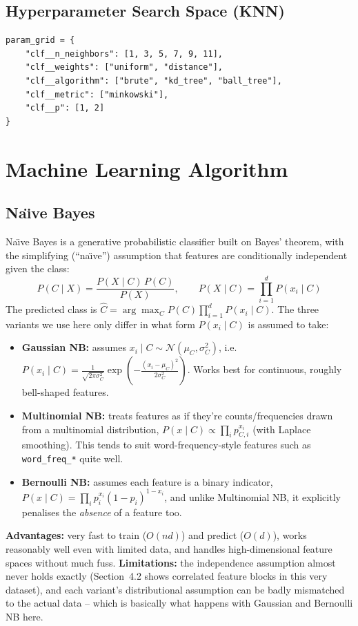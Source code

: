 \documentclass[12pt,a4paper]{article}
\begin{document}
\subsection*{Hyperparameter Search Space (KNN)}
\begin{lstlisting}
param_grid = {
    "clf__n_neighbors": [1, 3, 5, 7, 9, 11],
    "clf__weights": ["uniform", "distance"],
    "clf__algorithm": ["brute", "kd_tree", "ball_tree"],
    "clf__metric": ["minkowski"],
    "clf__p": [1, 2]
}
\end{lstlisting}


\section{Machine Learning Algorithm}
\subsection{Na\"{\i}ve Bayes}
Na\"{\i}ve Bayes is a generative probabilistic classifier built on Bayes' theorem, with the simplifying (``na\"{\i}ve'') assumption that features are conditionally independent given the class:
\[
P(C \mid X) = \frac{P(X \mid C)\,P(C)}{P(X)}, \qquad P(X \mid C) = \prod_{i=1}^{d} P(x_i \mid C)
\]
The predicted class is $\hat{C} = \arg\max_{C} P(C)\prod_{i=1}^{d}P(x_i\mid C)$. The three variants we use here only differ in what form $P(x_i \mid C)$ is assumed to take:
\begin{itemize}[leftmargin=*]
\item \textbf{Gaussian NB:} assumes $x_i \mid C \sim \mathcal{N}(\mu_C,\sigma_C^2)$, i.e.\ $P(x_i\mid C)=\frac{1}{\sqrt{2\pi\sigma_C^2}}\exp\!\left(-\frac{(x_i-\mu_C)^2}{2\sigma_C^2}\right)$. Works best for continuous, roughly bell-shaped features.
\item \textbf{Multinomial NB:} treats features as if they're counts/frequencies drawn from a multinomial distribution, $P(x\mid C)\propto\prod_i p_{C,i}^{x_i}$ (with Laplace smoothing). This tends to suit word-frequency-style features such as \texttt{word\_freq\_*} quite well.
\item \textbf{Bernoulli NB:} assumes each feature is a binary indicator, $P(x\mid C)=\prod_i p_i^{x_i}(1-p_i)^{1-x_i}$, and unlike Multinomial NB, it explicitly penalises the \emph{absence} of a feature too.
\end{itemize}
\textbf{Advantages:} very fast to train ($O(nd)$) and predict ($O(d)$), works reasonably well even with limited data, and handles high-dimensional feature spaces without much fuss. \textbf{Limitations:} the independence assumption almost never holds exactly (Section~4.2 shows correlated feature blocks in this very dataset), and each variant's distributional assumption can be badly mismatched to the actual data -- which is basically what happens with Gaussian and Bernoulli NB here.
 
\end{document}
